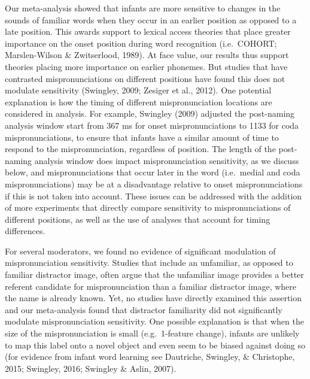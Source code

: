 \documentclass[
  english,
  man, noextraspace]{apa6}
\begin{document}
Our meta-analysis showed that infants are more sensitive to changes in the sounds of familiar words when they occur in an earlier position as opposed to a late position. This awards support to lexical access theories that place greater importance on the onset position during word recognition (i.e.~COHORT; Marslen-Wilson \& Zwitserlood, 1989). At face value, our results thus support theories placing more importance on earlier phonemes. But studies that have contrasted mispronunciations on different positions have found this does not modulate sensitivity (Swingley, 2009; Zesiger et al., 2012). One potential explanation is how the timing of different mispronunciation locations are considered in analysis. For example, Swingley (2009) adjusted the post-naming analysis window start from 367 ms for onset mispronunciations to 1133 for coda mispronunciations, to ensure that infants have a similar amount of time to respond to the mispronunciation, regardless of position. The length of the post-naming analysis window does impact mispronunciation sensitivity, as we discuss below, and mispronunciations that occur later in the word (i.e.~medial and coda mispronunciations) may be at a disadvantage relative to onset mispronunciations if this is not taken into account. These issues can be addressed with the addition of more experiments that directly compare sensitivity to mispronunciations of different positions, as well as the use of analyses that account for timing differences.

For several moderators, we found no evidence of significant modulation of mispronunciation sensitivity. Studies that include an unfamiliar, as opposed to familiar distractor image, often argue that the unfamiliar image provides a better referent candidate for mispronunciation than a familiar distractor image, where the name is already known. Yet, no studies have directly examined this assertion and our meta-analysis found that distractor familiarity did not significantly modulate mispronunciation sensitivity. One possible explanation is that when the size of the mispronunciation is small (e.g.~1-feature change), infants are unlikely to map this label onto a novel object and even seem to be biased against doing so (for evidence from infant word learning see Dautriche, Swingley, \& Christophe, 2015; Swingley, 2016; Swingley \& Aslin, 2007).
\end{document}
